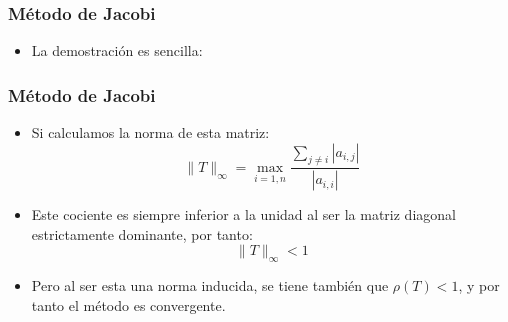 \documentclass[10pt]{beamer}
\begin{document}
      \begin{frame}
      \frametitle{M\'etodo de Jacobi}
      \begin{itemize}
      \item<1-> La demostraci\'on es sencilla:
      \end{itemize}
  \end{frame}       
  \begin{frame}
  \frametitle{M\'etodo de Jacobi}
  \begin{itemize}
  \item<1-> Si calculamos la norma de esta matriz:
  $$
  \|T\|_{\infty} = \max_{i=1,n}\frac{\sum_{j\neq i}|a_{i,j}|}{|a_{i,i}|}
  $$
  \item<2-> Este cociente es siempre inferior a la unidad al ser la matriz diagonal estrictamente dominante, por tanto:
  $$
  \|T\|_{\infty} <1
  $$
  \item<3->Pero al ser esta una norma inducida, se tiene tambi\'en que $\rho(T) < 1$, y por tanto el m\'etodo es convergente.
  \end{itemize}
  \end{frame}
\end{document}
